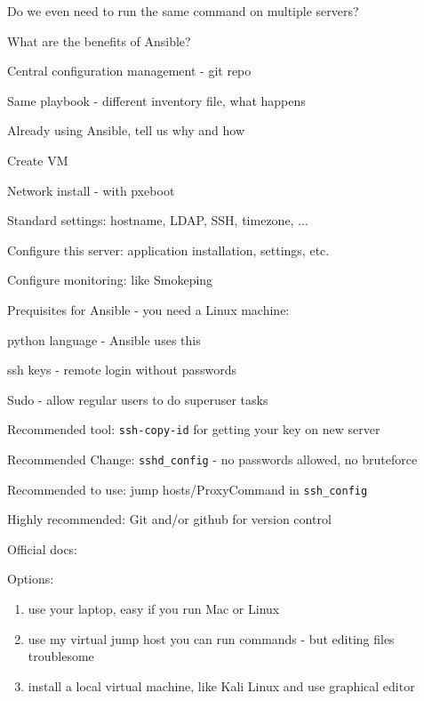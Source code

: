 \documentclass[18pt,landscape,a4paper,footrule]{foils}
\begin{document}
Do we even need to run the same command on multiple servers?

What are the benefits of Ansible?
\begin{list2}
\item Central configuration management - git repo
\item Same playbook - different inventory file, what happens
\item Already using Ansible, tell us why and how
\end{list2}


\begin{list2}
\item Create VM
\item Network install - with pxeboot
\item Standard settings: hostname, LDAP, SSH, timezone,  ...
\item Configure this server: application installation, settings, etc.
\item Configure monitoring: like Smokeping
\end{list2}



Prequisites for Ansible - you need a Linux machine:
\begin{list2}
\item python language - Ansible uses this
\item ssh keys - remote login without passwords
\item Sudo - allow regular users to do superuser tasks
\item Recommended tool: \verb+ssh-copy-id+ for getting your key on new server
\item Recommended Change: \verb+sshd_config+ - no passwords allowed, no bruteforce
\item Recommended to use: jump hosts/ProxyCommand in \verb+ssh_config+
\item Highly recommended: Git and/or github for version control
\end{list2}

Official docs:

Options:
\begin{enumerate}
\item use your laptop, easy if you run Mac or Linux
\item use my virtual jump host you can run commands - but editing files troublesome
\item install a local virtual machine, like Kali Linux and use graphical editor
\end{enumerate}
\end{document}

